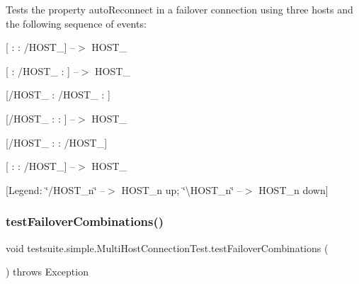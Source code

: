 Tests the property \textquotesingle{}auto\+Reconnect\textquotesingle{} in a failover connection using three hosts and the following sequence of events\+:
\begin{DoxyItemize}
\item \mbox{[} \+:  \+: /\+H\+O\+S\+T\+\_\mbox{]} --$>$ H\+O\+S\+T\+\_
\item \mbox{[} \+: /\+H\+O\+S\+T\+\_ \+: \mbox{]} --$>$ H\+O\+S\+T\+\_
\item \mbox{[}/\+H\+O\+S\+T\+\_ \+: /\+H\+O\+S\+T\+\_ \+: \mbox{]}
\item \mbox{[}/\+H\+O\+S\+T\+\_ \+:  \+: \mbox{]} --$>$ H\+O\+S\+T\+\_
\item \mbox{[}/\+H\+O\+S\+T\+\_ \+:  \+: /\+H\+O\+S\+T\+\_\mbox{]}
\item \mbox{[} \+:  \+: /\+H\+O\+S\+T\+\_\mbox{]} --$>$ H\+O\+S\+T\+\_
\end{DoxyItemize}

\mbox{[}Legend\+: \char`\"{}/\+H\+O\+S\+T\+\_\+n\char`\"{} --$>$ H\+O\+S\+T\+\_\+n up; \char`\"{}\textbackslash{}\+H\+O\+S\+T\+\_\+n\char`\"{} --$>$ H\+O\+S\+T\+\_\+n down\mbox{]} \mbox{\label{classtestsuite_1_1simple_1_1_multi_host_connection_test_a3d67cb5298918a721fd213e23aad5d22}} 
\subsubsection{\texorpdfstring{test\+Failover\+Combinations()}{testFailoverCombinations()}}
{\footnotesize\ttfamily void testsuite.\+simple.\+Multi\+Host\+Connection\+Test.\+test\+Failover\+Combinations (\begin{DoxyParamCaption}{ }\end{DoxyParamCaption}) throws Exception}

